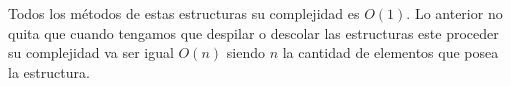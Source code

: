 Todos los métodos de estas estructuras su complejidad es $O(1)$. Lo anterior no quita que cuando tengamos que despilar o descolar las estructuras este proceder su complejidad va ser igual $O(n)$ siendo $n$ la cantidad de elementos que posea la estructura. 